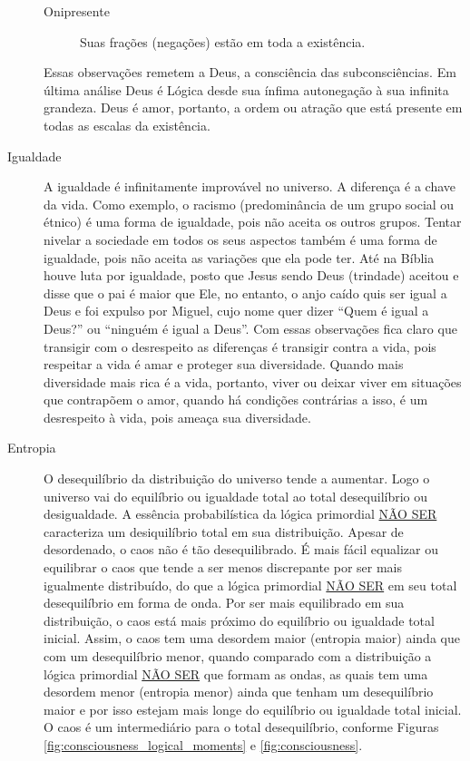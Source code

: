 \begin{description}
\begin{description}
		   \item[Onipresente] Suas frações (negações) estão em toda a existência.
	   \end{description}
	Essas observações remetem a Deus, a consciência das subconsciências. Em última análise Deus é Lógica desde sua ínfima autonegação à sua infinita grandeza. Deus é amor, portanto, a ordem ou atração que está presente em todas as escalas da existência.
	   \item[Igualdade] A igualdade é infinitamente improvável no universo. A diferença é a chave da vida. Como exemplo, o racismo (predominância de um grupo social ou étnico) é uma forma de igualdade, pois não aceita os outros grupos. Tentar nivelar a sociedade em todos os seus aspectos também é uma forma de igualdade, pois não aceita as variações que ela pode ter. Até na Bíblia houve luta por igualdade, posto que Jesus sendo Deus (trindade) aceitou e disse que o pai é maior que Ele, no entanto, o anjo caído quis ser igual a Deus e foi expulso por Miguel, cujo nome quer dizer “Quem é igual a Deus?” ou “ninguém é igual a Deus”. Com essas observações fica claro que transigir com o desrespeito as diferenças é transigir contra a vida, pois respeitar a vida é amar e proteger sua diversidade. Quando mais diversidade mais rica é a vida, portanto, viver ou deixar viver em situações que contrapõem o amor, quando há condições contrárias a isso, é um desrespeito à vida, pois ameaça sua diversidade. 
	   \item[Entropia] O desequilíbrio da distribuição do universo tende a aumentar. Logo o universo vai do equilíbrio ou igualdade total ao total desequilíbrio ou desigualdade. A essência probabilística da lógica primordial \underline{NÃO SER} caracteriza um desiquilíbrio total em sua distribuição. Apesar de desordenado, o caos não é tão desequilibrado. É mais fácil equalizar ou equilibrar o caos que tende a ser menos discrepante por ser mais igualmente distribuído, do que a lógica primordial \underline{NÃO SER} em seu total desequilíbrio em forma de onda. Por ser mais equilibrado em sua distribuição, o caos está mais próximo do equilíbrio ou igualdade total inicial. Assim, o caos tem uma desordem maior (entropia maior) ainda que com um desequilíbrio menor, quando comparado com a distribuição a lógica primordial \underline{NÃO SER} que formam as ondas, as quais tem uma desordem menor (entropia menor) ainda que tenham um desequilíbrio maior e por isso estejam mais longe do equilíbrio ou igualdade total inicial. O caos é um intermediário para o total desequilíbrio, conforme Figuras \ref{fig:consciousness_logical_moments} e \ref{fig:consciousness}.

\end{description}
